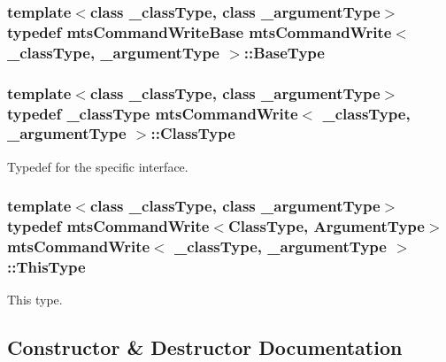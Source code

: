 \subsubsection[{Base\+Type}]{\setlength{\rightskip}{0pt plus 5cm}template$<$class \+\_\+class\+Type, class \+\_\+argument\+Type$>$ typedef {\bf mts\+Command\+Write\+Base} {\bf mts\+Command\+Write}$<$ \+\_\+class\+Type, \+\_\+argument\+Type $>$\+::{\bf Base\+Type}}\label{classmts_command_write_a40dcfd022c15b4411c0eb5d8fc670dcd}
\hypertarget{classmts_command_write_aeccc8c434133c4adae34916b42ad493c}{}
\subsubsection[{Class\+Type}]{\setlength{\rightskip}{0pt plus 5cm}template$<$class \+\_\+class\+Type, class \+\_\+argument\+Type$>$ typedef \+\_\+class\+Type {\bf mts\+Command\+Write}$<$ \+\_\+class\+Type, \+\_\+argument\+Type $>$\+::{\bf Class\+Type}}\label{classmts_command_write_aeccc8c434133c4adae34916b42ad493c}
Typedef for the specific interface. \hypertarget{classmts_command_write_a629a4131789c13f5bca121ccc8370ae3}{}
\subsubsection[{This\+Type}]{\setlength{\rightskip}{0pt plus 5cm}template$<$class \+\_\+class\+Type, class \+\_\+argument\+Type$>$ typedef {\bf mts\+Command\+Write}$<${\bf Class\+Type}, {\bf Argument\+Type}$>$ {\bf mts\+Command\+Write}$<$ \+\_\+class\+Type, \+\_\+argument\+Type $>$\+::{\bf This\+Type}}\label{classmts_command_write_a629a4131789c13f5bca121ccc8370ae3}
This type. 

\subsection{Constructor \& Destructor Documentation}
\hypertarget{classmts_command_write_ae9a351c406c99b4a49f475dc8b9c01f9}{}
